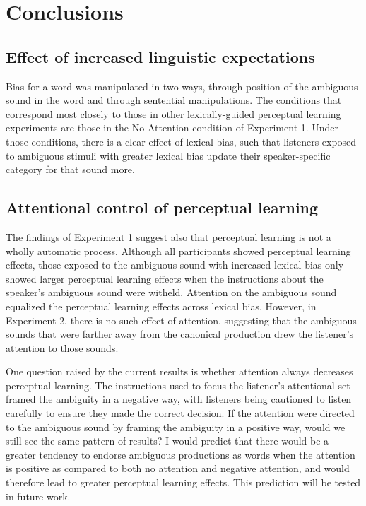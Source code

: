 
\chapter{Conclusions}
\label{chap:conclusion}

\section{Effect of increased linguistic expectations}

Bias for a word was manipulated in two ways, through position of the ambiguous sound in the word and through sentential manipulations.
The conditions that correspond most closely to those in other lexically-guided perceptual learning experiments \citep{Norris2003, Kraljic2005} are those in the No Attention condition of Experiment 1.
Under those conditions, there is a clear effect of lexical bias, such that listeners exposed to ambiguous stimuli with greater lexical bias update their speaker-specific category for that sound more.


\section{Attentional control of perceptual learning}

The findings of Experiment 1 suggest also that perceptual learning is not a wholly automatic process.  Although all participants showed perceptual learning effects, those exposed to the ambiguous sound with increased lexical bias only showed larger perceptual learning effects when the instructions about the speaker's ambiguous sound were witheld.  Attention on the ambiguous sound equalized the perceptual learning effects across lexical bias.
However, in Experiment 2, there is no such effect of attention, suggesting that the ambiguous sounds that were farther away from the canonical production drew the listener's attention to those sounds.

One question raised by the current results is whether attention always decreases perceptual learning.  
The instructions used to focus the listener's attentional set framed the ambiguity in a negative way, with listeners being cautioned to listen carefully to ensure they made the correct decision.  
If the attention were directed to the ambiguous sound by framing the ambiguity in a positive way, would we still see the same pattern of results?  
I would predict that there would be a greater tendency to endorse ambiguous productions as words when the attention is positive as compared to both no attention and negative attention, and would therefore lead to greater perceptual learning effects.  
This prediction will be tested in future work.

